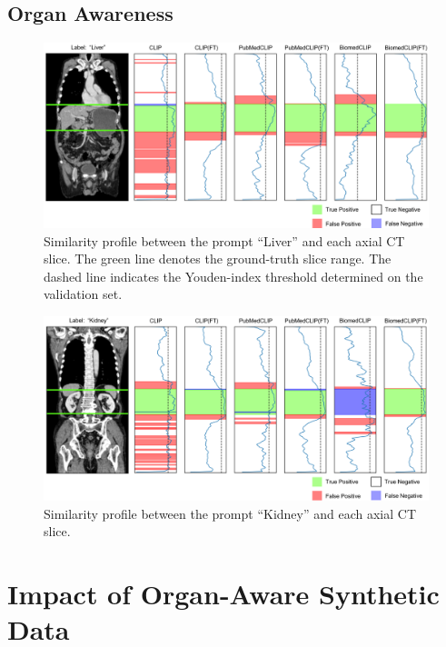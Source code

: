\documentclass[bioengineering,article,submit,pdftex,moreauthors]{Definitions/mdpi}
\begin{document}
\clearpage


\subsection{Organ Awareness}

\begin{figure}[ht]
  \centering
  \includegraphics[width=1\textwidth]{./figures/app_organ_aware_liver_2.png}
  \caption{Similarity profile between the prompt “Liver” and each axial CT slice. 
  The green line denotes the ground-truth slice range. 
  The dashed line indicates the Youden-index threshold determined on the validation set.}
  \label{fig:organ_aware_liver}
\end{figure}


\begin{figure}[ht]
  \centering
  \includegraphics[width=1\textwidth]{./figures/app_organ_aware_kidney_2.png}
  \caption{Similarity profile between the prompt “Kidney” and each axial CT slice.}
  \label{fig:organ_aware_kidney}
\end{figure}

\clearpage

\section{Impact of Organ-Aware Synthetic Data}\label{app:impact}
\end{document}

